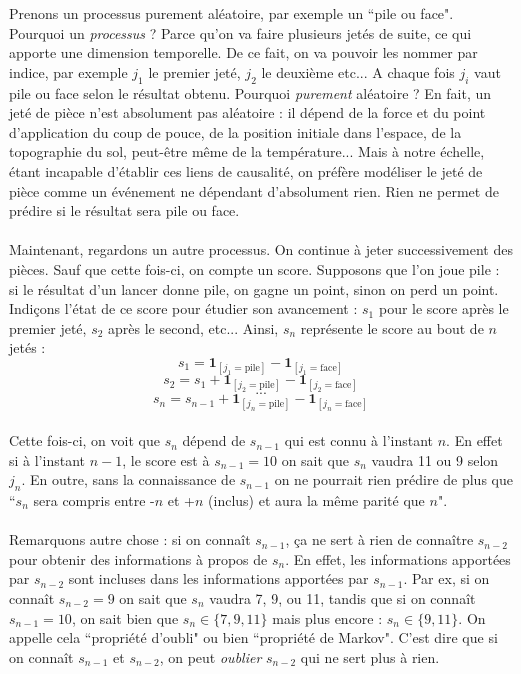 \documentclass{article}
\begin{document}
Prenons un processus purement aléatoire, par exemple un ``pile ou face". Pourquoi un \textit{processus} ? Parce qu'on va faire plusieurs jetés de suite, ce qui apporte une dimension temporelle. De ce fait, on va pouvoir les nommer par indice, par exemple $j_1$ le premier jeté, $j_2$ le deuxième etc... A chaque fois $j_i$ vaut pile ou face selon le résultat obtenu. Pourquoi \textit{purement} aléatoire ? En fait, un jeté de pièce n'est absolument pas aléatoire : il dépend de la force et du point d'application du coup de pouce, de la position initiale dans l'espace, de la topographie du sol, peut-\^etre m\^eme de la température... Mais à notre échelle, étant incapable d'établir ces liens de causalité, on préfère modéliser le jeté de pièce comme un événement ne dépendant d'absolument rien. Rien ne permet de prédire si le résultat sera pile ou face. \\
\\
Maintenant, regardons un autre processus. On continue à jeter successivement des pièces. Sauf que cette fois-ci, on compte un score. Supposons que l'on joue pile : si le résultat d'un lancer donne pile, on gagne un point, sinon on perd un point. Indiçons l'état de ce score pour étudier son avancement : $s_1$ pour le score après le premier jeté, $s_2$ après le second, etc... Ainsi, $s_n$ représente le score au bout de $n$ jetés :
\[s_1 = \textbf{1}_{[j_1 = \text{pile}]} - \textbf{1}_{[j_1 = \text{face}]}\]
\[s_2 = s_{1} + \textbf{1}_{[j_2 = \text{pile}]} - \textbf{1}_{[j_2 = \text{face}]}\]
\[...\]
\[s_n = s_{n-1} + \textbf{1}_{[j_n = \text{pile}]} - \textbf{1}_{[j_n = \text{face}]}\]
\\
Cette fois-ci, on voit que $s_n$ dépend de $s_{n-1}$ qui est connu à l'instant $n$. En effet si à l'instant $n-1$, le score est à $s_{n-1}=10$ on sait que $s_n$ vaudra 11 ou 9 selon $j_n$. En outre, sans  la connaissance de $s_{n-1}$ on ne pourrait rien prédire de plus que ``$s_n$ sera compris entre -$n$ et +$n$ (inclus) et aura la même parité que $n$". \\
\\
Remarquons autre chose : si on conna\^it $s_{n-1}$, ça ne sert à rien de conna\^itre $s_{n-2}$ pour obtenir des informations à propos de $s_n$. En effet, les informations apportées par $s_{n-2}$ sont incluses dans les informations apportées par $s_{n-1}$. Par ex, si on conna\^it $s_{n-2}=9$ on sait que $s_n$ vaudra 7, 9, ou 11, tandis que si on conna\^it $s_{n-1}=10$, on sait bien que $s_n\in \{7,9,11\}$ mais plus encore : $s_n\in \{9,11\}$. On appelle cela ``propriété d'oubli" ou bien ``propriété de Markov".   C'est dire que si on conna\^ it $s_{n-1}$ et $s_{n-2}$, on peut \textit{oublier} $s_{n-2}$ qui ne sert plus à rien. \\
\end{document}
